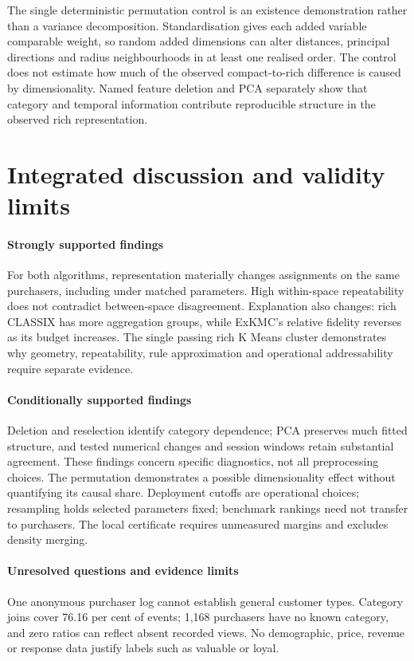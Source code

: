 The single deterministic permutation control is an existence demonstration rather than a variance decomposition. Standardisation gives each added variable comparable weight, so random added dimensions can alter distances, principal directions and radius neighbourhoods in at least one realised order. The control does not estimate how much of the observed compact-to-rich difference is caused by dimensionality. Named feature deletion and PCA separately show that category and temporal information contribute reproducible structure in the observed rich representation.

\section{Integrated discussion and validity limits}

\paragraph{Strongly supported findings}
For both algorithms, representation materially changes assignments on the same purchasers, including under matched parameters. High within-space repeatability does not contradict between-space disagreement. Explanation also changes: rich CLASSIX has more aggregation groups, while ExKMC's relative fidelity reverses as its budget increases. The single passing rich K Means cluster demonstrates why geometry, repeatability, rule approximation and operational addressability require separate evidence.

\paragraph{Conditionally supported findings}
Deletion and reselection identify category dependence; PCA preserves much fitted structure, and tested numerical changes and session windows retain substantial agreement. These findings concern specific diagnostics, not all preprocessing choices. The permutation demonstrates a possible dimensionality effect without quantifying its causal share. Deployment cutoffs are operational choices; resampling holds selected parameters fixed; benchmark rankings need not transfer to purchasers. The local certificate requires unmeasured margins and excludes density merging.

\paragraph{Unresolved questions and evidence limits}
One anonymous purchaser log cannot establish general customer types. Category joins cover 76.16 per cent of events; 1,168 purchasers have no known category, and zero ratios can reflect absent recorded views. No demographic, price, revenue or response data justify labels such as valuable or loyal.

